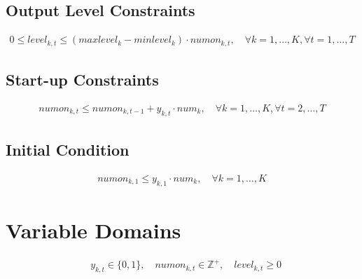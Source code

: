 \documentclass{article}
\begin{document}
\subsection*{Output Level Constraints}
\begin{align*}
    0 \leq level_{k,t} \leq (maxlevel_k - minlevel_k) \cdot numon_{k,t}, \quad \forall k = 1, \ldots, K, \forall t = 1, \ldots, T
\end{align*}

\subsection*{Start-up Constraints}
\begin{align*}
    numon_{k,t} \leq numon_{k,t-1} + y_{k,t} \cdot num_k, \quad \forall k = 1, \ldots, K, \forall t = 2, \ldots, T
\end{align*}

\subsection*{Initial Condition}
\begin{align*}
    numon_{k,1} \leq y_{k,1} \cdot num_k, \quad \forall k = 1, \ldots, K
\end{align*}

\section*{Variable Domains}
\begin{align*}
    & y_{k,t} \in \{0, 1\}, \quad numon_{k,t} \in \mathbb{Z}^+, \quad level_{k,t} \geq 0
\end{align*}
\end{document}
